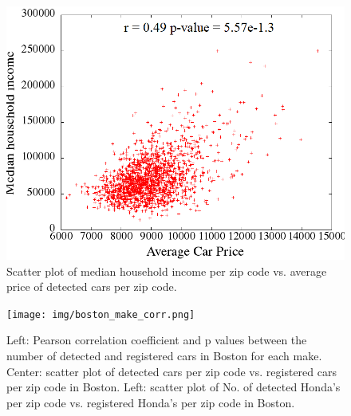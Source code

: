 \documentclass[10pt,twocolumn,letterpaper]{article}
\begin{document}
\begin{figure}[t]
\begin{center}
   \includegraphics[width=0.9\linewidth]{img/averagePriceIncome.png}
\end{center}
   \caption {Scatter plot of median household income per zip code vs. average price of detected cars per zip code.}
\label{fig:price-income-corr}
\end{figure}

\begin{figure} [t]
\begin{center}
\texttt{[image: img/boston\_make\_corr.png]}
\end{center}
\caption {Left: Pearson correlation coefficient and p values between the number of detected and registered cars in Boston for each make. Center: scatter plot of detected cars per zip code vs. registered cars per zip code in Boston. Left: scatter plot of No. of detected Honda's per zip code vs. registered Honda's per zip code in Boston.}
\label{fig:ma_corrs}
\end{figure}
\end{document}
